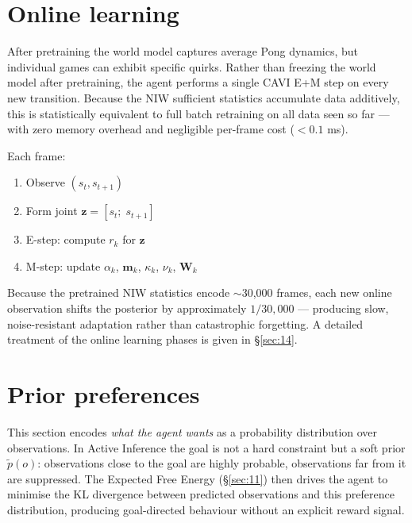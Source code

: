 \documentclass[12pt, a4paper]{article}
\newcommand{\1}{\mathbf{1}}
\begin{document}
\section{Online learning}
\label{sec:6}

After pretraining the world model captures average Pong dynamics, but individual
games can exhibit specific quirks.  Rather than freezing the world model after
pretraining, the agent performs a single CAVI E+M step on every new transition.
Because the NIW sufficient statistics accumulate data additively, this is
statistically equivalent to full batch retraining on all data seen so far ---
with zero memory overhead and negligible per-frame cost ($<0.1$ ms).

Each frame:
\begin{enumerate}
  \item Observe $(s_t, s_{t+1})$
  \item Form joint $\mathbf{z} = [s_t;\; s_{t+1}]$
  \item E-step: compute $r_{k}$ for $\mathbf{z}$
  \item M-step: update $\alpha_k$, $\mathbf{m}_k$, $\kappa_k$, $\nu_k$, $\mathbf{W}_k$
\end{enumerate}

Because the pretrained NIW statistics encode $\sim$30,000 frames, each new online
observation shifts the posterior by approximately $1/30{,}000$ --- producing slow,
noise-resistant adaptation rather than catastrophic forgetting.  A detailed
treatment of the online learning phases is given in \S\ref{sec:14}.

\section{Prior preferences}
\label{sec:7}

This section encodes \textit{what the agent wants} as a probability distribution
over observations.  In Active Inference the goal is not a hard constraint but a
soft prior $\tilde{p}(o)$: observations close to the goal are highly probable,
observations far from it are suppressed.  The Expected Free Energy (\S\ref{sec:11})
then drives the agent to minimise the KL divergence between predicted observations
and this preference distribution, producing goal-directed behaviour without an
explicit reward signal.
\end{document}
